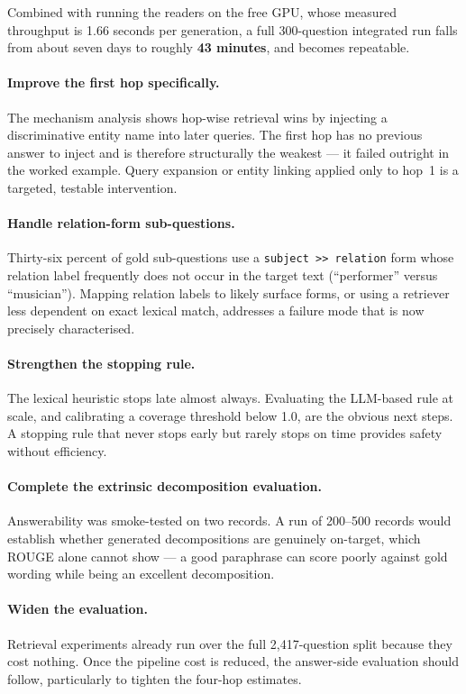 \documentclass[11pt,a4paper]{article}
\newcommand{\code}[1]{\texttt{\small #1}}
\begin{document}
Combined with running the readers on the free GPU, whose measured throughput is
1.66 seconds per generation, a full 300-question integrated run falls from about
seven days to roughly \textbf{43 minutes}, and becomes repeatable.

\paragraph{Improve the first hop specifically.}
The mechanism analysis shows hop-wise retrieval wins by injecting a
discriminative entity name into later queries. The first hop has no previous
answer to inject and is therefore structurally the weakest --- it failed
outright in the worked example. Query expansion or entity linking applied only to
hop~1 is a targeted, testable intervention.

\paragraph{Handle relation-form sub-questions.}
Thirty-six percent of gold sub-questions use a \code{subject >> relation} form
whose relation label frequently does not occur in the target text
(``performer'' versus ``musician''). Mapping relation labels to likely surface
forms, or using a retriever less dependent on exact lexical match, addresses a
failure mode that is now precisely characterised.

\paragraph{Strengthen the stopping rule.}
The lexical heuristic stops late almost always. Evaluating the LLM-based rule at
scale, and calibrating a coverage threshold below 1.0, are the obvious next
steps. A stopping rule that never stops early but rarely stops on time provides
safety without efficiency.

\paragraph{Complete the extrinsic decomposition evaluation.}
Answerability was smoke-tested on two records. A run of 200--500 records would
establish whether generated decompositions are genuinely on-target, which
ROUGE alone cannot show --- a good paraphrase can score poorly against gold
wording while being an excellent decomposition.

\paragraph{Widen the evaluation.}
Retrieval experiments already run over the full 2{,}417-question split because
they cost nothing. Once the pipeline cost is reduced, the answer-side evaluation
should follow, particularly to tighten the four-hop estimates.
\end{document}
